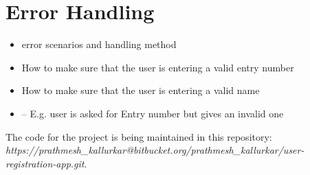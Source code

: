 \documentclass[12pt,a4paper,titlepage]{article}
\begin{document}
\section{Error Handling}
\begin{itemize}
	        
	\item error scenarios and handling method
	      
	      
	\item How to make sure that the user is entering a valid entry number
	\item How to make sure that the user is entering a valid name
	          
	\item – E.g.	user	is	asked	for	Entry	number	but	gives	an	invalid	one	
\end{itemize}

The code for the project is being maintained in this repository: {\em https://prathmesh\_kallurkar@bitbucket.org/prathmesh\_kallurkar/user-registration-app.git}.



\end{document}
